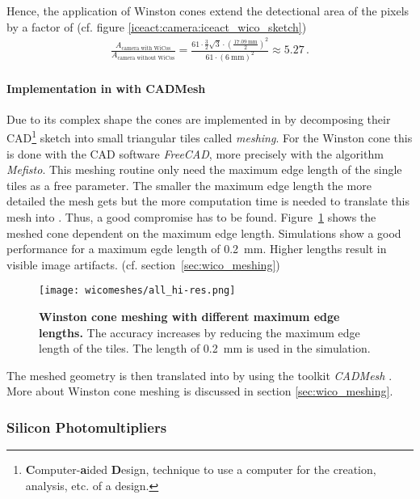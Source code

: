 Hence, the application of Winston cones extend the detectional area of the pixels by a factor of (cf. figure \ref{iceact:camera:iceact_wico_sketch})
\begin{align}
	\frac{A_\text{camera with WiCos}}{A_\text{camera without WiCos}} = \frac{61\cdot \frac{3}{2}\sqrt{3}\cdot\left(\frac{\SI{17.09}{\milli\meter}}{2}\right)^2}{61\cdot(\SI{6}{\milli\meter})^2}\approx\num{5.27}\,.
\end{align}

\paragraph{Implementation in \geant with CADMesh}

Due to its complex shape the cones are implemented in \geant by decomposing their CAD\footnote{\textbf{C}omputer-\textbf{a}ided \textbf{D}esign, technique to use a computer for the creation, analysis, etc. of a design.} sketch into small triangular tiles called \textit{meshing}. For the \iceact Winston cone this is done with the CAD software \textit{FreeCAD}, more precisely with the algorithm \textit{Mefisto}. This meshing routine only need the maximum edge length of the single tiles as a free parameter. The smaller the maximum edge length the more detailed the mesh gets but the more computation time is needed to translate this mesh into \geant. Thus, a good compromise has to be found. Figure~\ref{wico:meshing} shows the meshed cone dependent on the maximum edge length. Simulations show a good performance for a maximum egde length of \SI{0.2}{\milli\meter}. Higher lengths result in visible image artifacts. (cf. section~\ref{sec:wico_meshing}) 

\begin{figure}[H]
	\centering
	\texttt{[image: wicomeshes/all\_hi-res.png]}
	\caption[\iceact Winston cone meshing with different maximum edge lengths]{\textbf{\iceact Winston cone meshing with different maximum edge lengths.} The accuracy increases by reducing the maximum edge length of the tiles. The length of \SI{0.2}{\milli\meter} is used in the simulation.}
	\label{wico:meshing}	
\end{figure}

The meshed geometry is then translated into \geant by using the toolkit \textit{CADMesh} \cite{wico:cadmesh}. More about Winston cone meshing is discussed in section \ref{sec:wico_meshing}.

\subsubsection{Silicon Photomultipliers}\label{sec:sipm}

